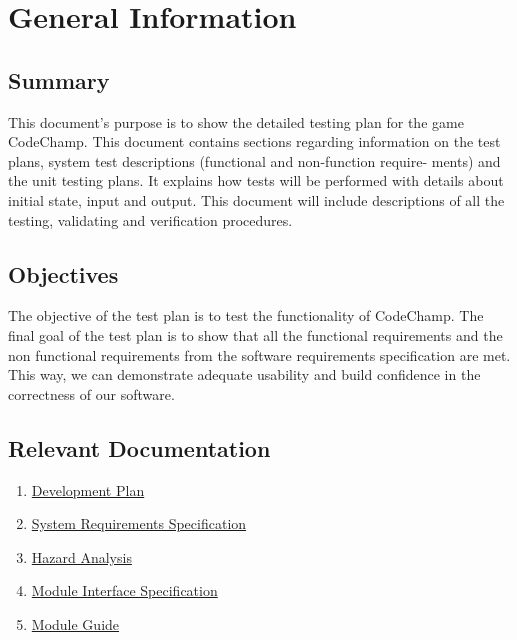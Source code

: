 \documentclass[12pt, titlepage]{article}
\begin{document}

\section{General Information}

\subsection{Summary}

This document’s purpose is to show the detailed testing plan for the game
CodeChamp. This document contains sections regarding information on the
test plans, system test descriptions (functional and non-function require-
ments) and the unit testing plans. It explains how tests will be performed
with details about initial state, input and output. This document will include
descriptions of all the testing, validating and verification procedures.

\subsection{Objectives}

  The objective of the test plan is to test the functionality of CodeChamp. The
final goal of the test plan is to show that all the functional requirements and
the non functional requirements from the software requirements specification are met.
This way, we can demonstrate adequate usability and build confidence in the correctness of our software.

\subsection{Relevant Documentation}


\begin{enumerate}
    \item \href{https://github.com/Tamas-Leung/CodeChamp/tree/main/docs/DevelopmentPlan}{Development Plan}
    \item \href{https://github.com/Tamas-Leung/CodeChamp/tree/main/docs/SRS}{System Requirements Specification} 
    \item \href{https://github.com/Tamas-Leung/CodeChamp/blob/main/docs/HazardAnalysis/HazardAnalysis.md}{Hazard Analysis} 
    \item \href{https://github.com/Tamas-Leung/CodeChamp/tree/main/docs/Design/MIS}{Module Interface Specification} 
    \item \href{https://github.com/Tamas-Leung/CodeChamp/tree/main/docs/Design/MG}{Module Guide} 
\end{enumerate}
\end{document}
